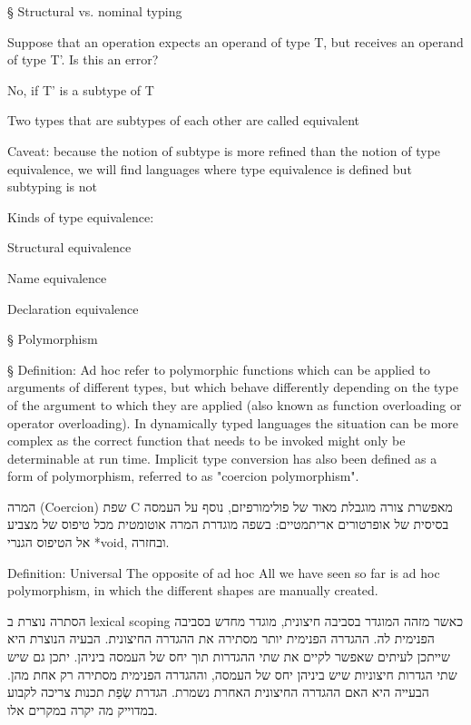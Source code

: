 \begin{טבלא}[!htbp]
§ Structural vs. nominal typing
          \item Suppose that an operation expects an operand of type T, but receives
          an operand of type T’. Is this an error?
          \item No, if T’ is a subtype of T
          \item Two types that are subtypes of each other are called equivalent
          \item Caveat: because the notion of subtype is more refined than the notion of
        type equivalence, we will find languages where type equivalence is
        defined but subtyping is not

        Kinds of type equivalence:
          \item Structural equivalence
          \item Name equivalence
          \item Declaration equivalence

§ Polymorphism

§ Definition: Ad hoc
        refer to polymorphic functions which can be applied to arguments of different types, but which behave differently depending on the type of the argument to which they are applied (also known as function overloading or operator overloading).
        In dynamically typed languages the situation can be more complex as the correct function that needs to be invoked might only be determinable at run time.
        Implicit type conversion has also been defined as a form of polymorphism, referred to as "coercion polymorphism".

        המרה (Coercion)
        שפת C מאפשרת צורה מוגבלת מאוד של פולימורפיזם, נוסף על העמסה בסיסית של אופרטורים אריתמטיים: בשפה מוגדרת המרה אוטומטית מכל טיפוס של מצביע אל הטיפוס הגנרי *void, ובחזרה.

        Definition: Universal
        The opposite of ad hoc All we have seen so far is ad hoc polymorphism, in which the different shapes are manually created.

        הסתרה נוצרת ב lexical scoping כאשר מזהה המוגדר בסביבה חיצונית, מוגדר מחדש בסביבה הפנימית לה. ההגדרה הפנימית יותר מסתירה את ההגדרה החיצונית. הבעיה הנוצרת היא שייתכן לעיתים שאפשר לקיים את שתי ההגדרות תוך יחס של העמסה ביניהן. יתכן גם שיש שתי הגדרות חיצוניות שיש ביניהן יחס של העמסה, וההגדרה הפנימית מסתירה רק אחת מהן. הבעייה היא האם ההגדרה החיצונית האחרת נשמרת. הגדרת שְׂפַת תכנות צריכה לקבוע במדוייק מה יקרה במקרים אלו.


\end{טבלא}
